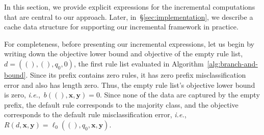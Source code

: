 \documentclass[twoside,11pt]{article}
\def\ie{{\it i.e.},~}
\newcommand{\x}{\mathbf{x}}
\newcommand{\y}{\mathbf{y}}
\def\RL{{d}}
\def\Default{q_0}
\def\Obj{R}
\def\Loss{\ell}
\begin{document}
\begin{arxiv}
In this section, we provide explicit expressions for
the incremental computations that are central to our approach.
%
Later, in~\S\ref{sec:implementation}, we describe a cache data structure
for supporting our incremental framework in practice.

For completeness, before presenting our incremental expressions,
let us begin by writing down the objective lower bound and objective
of the empty rule list, ${\RL = ((), (), \Default, 0)}$,
the first rule list evaluated in Algorithm~\ref{alg:branch-and-bound}.
%
Since its prefix contains zero rules, it has zero prefix
misclassification error and also has length zero.
%
Thus, the empty rule list's objective lower bound is zero, \ie ${b((), \x, \y) = 0}$.
%
Since none of the data are captured by the empty prefix, the default rule
corresponds to the majority class, and the objective corresponds to the
default rule misclassification error, \ie ${\Obj(\RL, \x, \y) = \Loss_0((), \Default, \x, \y)}$.


\end{arxiv}
\end{document}
